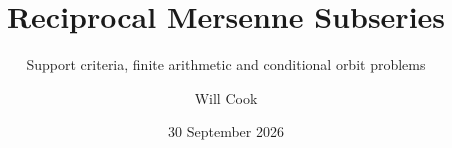 \documentclass[11pt]{article}
\title{Reciprocal Mersenne Subseries}
\subtitle{Support criteria, finite arithmetic and conditional orbit problems}
\author{Will Cook}
\date{30 September 2026}
\theoremstyle{plain}
\theoremstyle{definition}
\theoremstyle{remark}
\begin{document}
\newcommand{\Ach}{\mathcal A}
\end{document}
